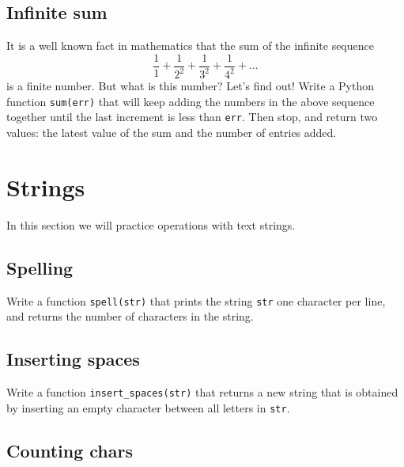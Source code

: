 
\subsection{Infinite sum}

It is a well known fact in mathematics that the sum of the infinite sequence 
$$
\frac{1}{1} + \frac{1}{2^2} +\frac{1}{3^2} + \frac{1}{4^2} + \ldots
$$
is a finite number. But what is this number? Let's find out!
Write a Python function {\tt sum(err)} that will keep adding the 
numbers in the above sequence together until the last increment 
is less than {\tt err}. Then stop, and return two values: the latest 
value of the sum and the number of entries added.


\section{Strings}

In this section we will practice operations with text strings.


\subsection{Spelling}

Write a function {\tt spell(str)} that prints the string {\tt str} one character 
per line, and returns the number of characters in the string.


\subsection{Inserting spaces}

Write a function {\tt insert\_spaces(str)} that returns a new string that is obtained 
by inserting an empty character between all letters in {\tt str}. 


\subsection{Counting chars}

